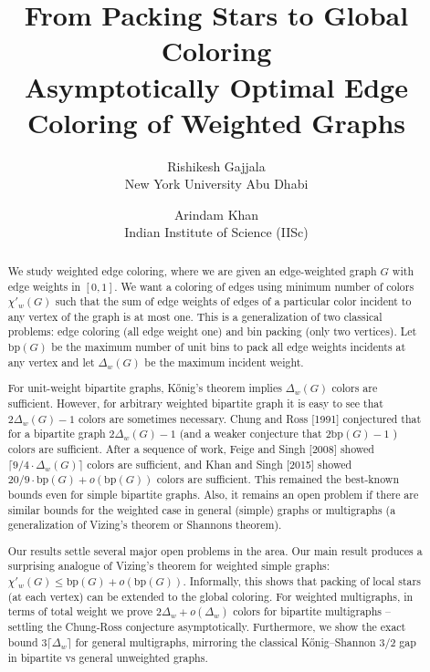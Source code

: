 \documentclass[11pt]{article}
\title{From Packing Stars to Global Coloring\\\large Asymptotically Optimal Edge Coloring of Weighted Graphs}
\author{Rishikesh Gajjala\\\small New York University Abu Dhabi
 \and Arindam Khan\\\small Indian Institute of Science (IISc)}
\date{}
\theoremstyle{definition}\newtheorem{algorithm}{Algorithm}[section]
\numberwithin{equation}{section}
\theoremstyle{remark}\newtheorem*{remark}{Remark}
\begin{document}
\maketitle\vspace{-12pt}
\begin{abstract}
We study weighted edge coloring, where we are given an edge-weighted graph $G$ with edge weights in $[0,1]$. We want a coloring of edges using minimum number of colors $\chi'_w(G)$ such that the sum of edge weights of edges of a particular color incident to any vertex of the graph is at most one.  
This is a generalization of two classical problems: edge coloring (all edge weight one) and bin packing (only two vertices). Let $\mathrm{bp}(G)$ be the maximum number of unit bins to pack all edge weights incidents at any vertex and let $\Delta_w(G)$ be the maximum incident weight.  

For unit-weight bipartite graphs, Kőnig's theorem implies $\Delta_w(G)$ colors are sufficient. However, for arbitrary weighted bipartite graph it is easy to see that $2\Delta_w(G)-1$ colors are sometimes necessary. 
Chung and Ross [1991] conjectured that for a bipartite graph $2\Delta_w(G)-1$ (and a weaker conjecture that $2\mathrm{bp}(G)-1$ ) colors are sufficient. 
After a sequence of work, Feige and Singh [2008] showed $\lceil 9/4 \cdot \Delta_w(G) \rceil$ colors are sufficient, and Khan and Singh [2015] showed $20/9 \cdot \mathrm{bp}(G) +o(\mathrm{bp}(G))$ colors are sufficient. This remained the best-known bounds even for simple bipartite graphs. 
Also, it remains an open problem if there are similar bounds for the weighted case in general (simple) graphs or multigraphs (a generalization of Vizing's theorem or Shannons theorem). 

Our results settle several major open problems in the area.
Our main result produces a surprising analogue of Vizing's theorem for weighted simple graphs:
$\chi'_w(G)\le \mathrm{bp}(G)+o(\mathrm{bp}(G))$.
Informally, this shows that packing of local stars (at each vertex) can be extended to the global coloring. 
For weighted multigraphs, in terms of total weight we prove
$2\Delta_w+o(\Delta_w)$ colors for bipartite multigraphs -- settling the Chung-Ross conjecture asymptotically. 
Furthermore, we show the exact bound $3\lceil\Delta_w\rceil$ for general multigraphs, mirroring the classical Kőnig--Shannon 3/2 gap in bipartite vs general unweighted graphs.


\end{abstract}
\end{document}
